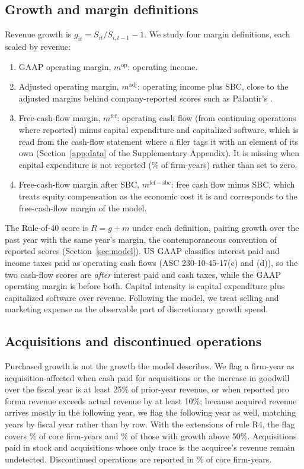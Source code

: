 \subsection{Growth and margin definitions}
Revenue growth is $g_{it}=S_{it}/S_{i,t-1}-1$. We study four margin definitions, each scaled by revenue:
\begin{enumerate}
\item GAAP operating margin, $m^{\mathrm{op}}$: operating income.
\item Adjusted operating margin, $m^{\mathrm{adj}}$: operating income plus SBC, close to the adjusted margins behind company-reported scores such as Palantir's \citep{palantir2026q2}.
\item Free-cash-flow margin, $m^{\mathrm{fcf}}$: operating cash flow (from continuing operations where reported) minus capital expenditure and capitalized software, which is read from the cash-flow statement where a filer tags it with an element of its own (Section~\ref{app:data} of the Supplementary Appendix). It is missing when capital expenditure is not reported (\VCapexMissing\% of firm-years) rather than set to zero.
\item Free-cash-flow margin after SBC, $m^{\mathrm{fcf-sbc}}$: free cash flow minus SBC, which treats equity compensation as the economic cost it is and corresponds to the free-cash-flow margin of the model.
\end{enumerate}
The Rule-of-40 score is $R=g+m$ under each definition, pairing growth over the past year with the same year's margin, the contemporaneous convention of reported scores (Section~\ref{sec:model}). US GAAP classifies interest paid and income taxes paid as operating cash flows (ASC 230-10-45-17(c) and (d)), so the two cash-flow scores are \emph{after} interest paid and cash taxes, while the GAAP operating margin is before both. Capital intensity is capital expenditure plus capitalized software over revenue. Following the model, we treat selling and marketing expense as the observable part of discretionary growth spend.

\subsection{Acquisitions and discontinued operations}\label{sec:data-acq}
Purchased growth is not the growth the model describes. We flag a firm-year as acquisition-affected when cash paid for acquisitions or the increase in goodwill over the fiscal year is at least 25\% of prior-year revenue, or when reported pro forma revenue exceeds actual revenue by at least 10\%; because acquired revenue arrives mostly in the following year, we flag the following year as well, matching years by fiscal year rather than by row. With the extensions of rule R4, the flag covers \VAcqShare\% of core firm-years and \VAcqShareFast\% of those with growth above 50\%. Acquisitions paid in stock and acquisitions whose only trace is the acquiree's revenue remain undetected. Discontinued operations are reported in \VDiscShare\% of core firm-years.


